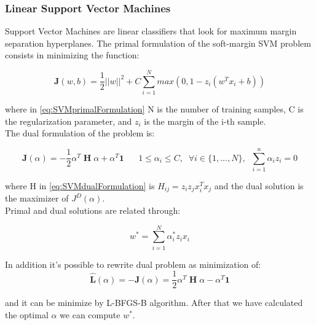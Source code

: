 
\subsubsection{Linear Support Vector Machines}
Support Vector Machines are linear classifiers that look for maximum margin separation hyperplanes.
The primal formulation of the soft-margin SVM problem consists in minimizing the function:

\begin{equation}
    \mathbf{J}(w,b)= \frac{1}{2}||w||^2 + C\sum_{i=1}^{N}max(0,1-z_i(w^Tx_i+b))
    \label{eq:SVMprimalFormulation}
\end{equation}

where in \autoref{eq:SVMprimalFormulation} N is the number of training samples, C is the regularization parameter,
and \(z_i\) is the margin of the i-th sample.\\
The dual formulation of the problem is:

\begin{equation}
    \mathbf{J}(\alpha)= - \frac{1}{2} \alpha^T \;\textbf{H} \;\alpha + \alpha^T \textbf{1} \;\;\;\;\;\;1\leq \alpha_i\leq C,\;\; \forall i \in \{1,...,N\},\;\; \sum_{i=1}^{n}\alpha_i z_i=0
    \label{eq:SVMdualFormulation}
\end{equation}

where H in  \autoref{eq:SVMdualFormulation} is \(H_{ij}=z_iz_jx_i^Tx_j\) and the dual solution is the maximizer of \(J^D(\alpha)\).\\
Primal and dual solutions are related through:

\begin{equation}
    w^*=\sum_{i=1}^{N}\alpha_i^* z_i x_i
\end{equation}

In addition it's possible to rewrite dual problem as minimization of:
\begin{equation}
    \hat{\mathbf{L}}(\alpha)=-\mathbf{J}(\alpha)= \frac{1}{2} \alpha^T \;\textbf{H} \;\alpha - \alpha^T \textbf{1}
\end{equation}

and it can be minimize by L-BFGS-B algorithm.
After that we have calculated the optimal \(\alpha\) we can compute \(w^*\).

